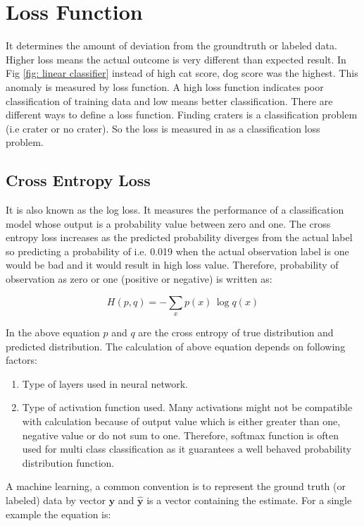 \documentclass[11pt]{article}
\begin{document}
\section{Loss Function}
It determines the amount of deviation from the groundtruth or labeled data. Higher loss means the actual outcome is very different than expected result. In Fig \ref{fig: linear classifier} instead of high cat score, dog score was the highest. This anomaly is measured by loss function. A high loss function indicates poor classification of training data and low means better classification. There are different ways to define a loss function. Finding craters is a classification problem (i.e crater or no crater). So the loss is measured in as a classification loss problem.

\subsection{Cross Entropy Loss}
It is also known as the log loss. It measures the performance of a classification model whose output is a probability value between zero and one. The cross entropy loss increases as the predicted probability diverges from the actual label so predicting a probability of i.e. 0.019 when the actual observation label is one would be bad and it would result in high loss value. Therefore, probability of observation as zero or one (positive or negative) is written as:

\begin{equation}
\label{crossent}
{\displaystyle H(p,q)=-\sum _{x}p(x)\,\log q(x)}
\end{equation}

In the above equation $p$ and $q$ are the cross entropy of true distribution and predicted distribution. The calculation of above equation depends on following factors:

\begin{enumerate}
	\item Type of layers used in neural network.
	\item Type of activation function used. Many activations might not be compatible with calculation because of output value which is either greater than one, negative value or do not sum to one. Therefore, softmax function is often used for multi class classification as it guarantees a well behaved probability distribution function.
\end{enumerate}

A machine learning, a common convention is to represent the ground truth (or labeled) data by vector $\mathbf{y}$ and $\mathbf{\hat{y}}$ is a vector containing the estimate. For a single example the equation is:
\end{document}
